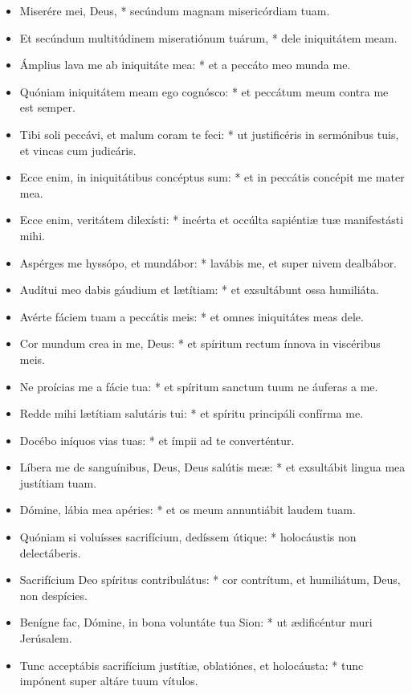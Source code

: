 \begin{itemize}[%
label=\null, %
leftmargin=0pt, %
itemindent=3mm, %
labelsep=0pt, %
labelwidth=0pt, %
rightmargin=0pt, %
parsep=0pt, %
topsep=0pt, %
itemsep=0pt]%


\item Miserére mei, Deus, * secúndum magnam misericórdiam tuam.
\item Et secúndum multitúdinem miseratiónum tuárum, * dele iniquitátem meam.
\item Ámplius lava me ab iniquitáte mea: * et a peccáto meo munda me.
\item Quóniam iniquitátem meam ego cognósco: * et peccátum meum contra me est semper.
\item Tibi soli peccávi, et malum coram te feci: * ut justificéris in sermónibus tuis, et vincas cum judicáris.
\item Ecce enim, in iniquitátibus concéptus sum: * et in peccátis concépit me mater mea.
\item Ecce enim, veritátem dilexísti: * incérta et occúlta sapiéntiæ tuæ manifestásti mihi.
\item Aspérges me hyssópo, et mundábor: * lavábis me, et super nivem dealbábor.
\item Audítui meo dabis gáudium et lætítiam: * et exsultábunt ossa humiliáta.
\item Avérte fáciem tuam a peccátis meis: * et omnes iniquitátes meas dele.
\item Cor mundum crea in me, Deus: * et spíritum rectum ínnova in viscéribus meis.
\item Ne proícias me a fácie tua: * et spíritum sanctum tuum ne áuferas a me.
\item Redde mihi lætítiam salutáris tui: * et spíritu principáli confírma me.
\item Docébo iníquos vias tuas: * et ímpii ad te converténtur.
\item Líbera me de sanguínibus, Deus, Deus salútis meæ: * et exsultábit lingua mea justítiam tuam.
\item Dómine, lábia mea apéries: * et os meum annuntiábit laudem tuam.
\item Quóniam si voluísses sacrifícium, dedíssem útique: * holocáustis non delectáberis.
\item Sacrifícium Deo spíritus contribulátus: * cor contrítum, et humiliátum, Deus, non despícies.
\item Benígne fac, Dómine, in bona voluntáte tua Sion: * ut ædificéntur muri Jerúsalem.
\item Tunc acceptábis sacrifícium justítiæ, oblatiónes, et holocáusta: * tunc impónent super altáre tuum vítulos.

\end{itemize}